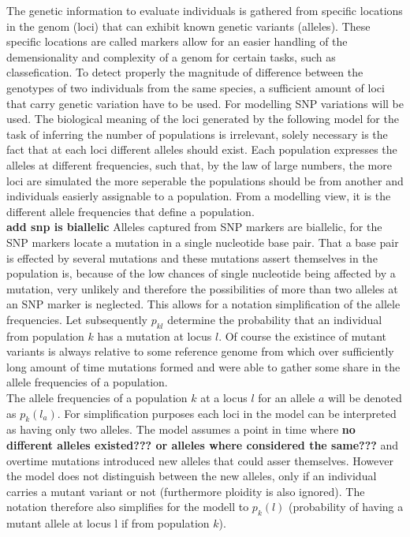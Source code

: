 \documentclass[a4paper, 11pt]{article}
\begin{document}
The genetic information to evaluate individuals is gathered from specific locations in the genom (loci) that can exhibit known genetic variants (alleles). These specific locations are called markers allow for an easier handling of the demensionality and complexity of a genom for certain tasks, such as classefication. To detect properly the magnitude of difference between the genotypes of two individuals from the same species, a sufficient amount of loci that carry genetic variation have to be used. For modelling SNP variations will be used. The biological meaning of the loci generated by the following model for the task of inferring the number of populations is irrelevant, solely necessary is the fact that at each loci different alleles should exist. Each population expresses the alleles at different frequencies, such that, by the law of large numbers, the more loci are simulated the more seperable the populations should be from another and individuals easierly assignable to a population. From a modelling view, it is the different allele frequencies that define a population. \\

\textbf{add snp is biallelic}
Alleles captured from SNP markers are biallelic, for the SNP markers locate a mutation in a single nucleotide base pair. That a base pair is effected by several mutations and these mutations assert themselves in the population is, because of the low chances of single nucleotide being affected by a mutation, very unlikely and therefore the possibilities of more than two alleles at an SNP marker is neglected. This allows for a notation simplification of the allele frequencies. Let subsequently  $p_{kl}$ determine the probability that an individual from population $k$ has a mutation at locus $l$. Of course the existince of mutant variants is always relative to some reference genome from which over sufficiently long amount of time mutations formed and were able to gather some share in the allele frequencies of a population.\\

The allele frequencies of a population $k$ at a locus $l$ for an allele $a$ will be denoted as $p_k(l_a)$. For simplification purposes each loci in the model can be interpreted as having only two alleles. The model assumes a point in time where \textbf{no different alleles existed??? or alleles where considered the same???} and overtime mutations introduced new alleles that could asser themselves. However the model does not distinguish between the new alleles, only if an individual carries a mutant variant or not (furthermore ploidity is also ignored). The notation therefore also simplifies for the modell to $p_k(l)$ (probability of having a mutant allele at locus l if from population $k$).
\end{document}
